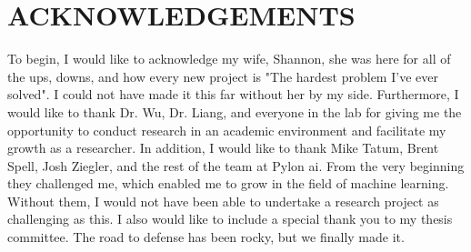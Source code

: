 \singlespacing
\chapter*{ACKNOWLEDGEMENTS}
\doublespacing
To begin, I would like to acknowledge my wife, Shannon, she was here for all of the ups, downs, and how every new project is "The hardest problem I've ever solved". I could not have made it this far without her by my side. Furthermore, I would like to thank Dr. Wu, Dr. Liang, and everyone in the lab for giving me the opportunity to conduct research in an academic environment and facilitate my growth as a researcher. In addition, I would like to thank Mike Tatum, Brent Spell, Josh Ziegler, and the rest of the team at Pylon ai. From the very beginning they challenged me, which enabled me to grow in the field of machine learning. Without them, I would not have been able to undertake a research project as challenging as this. I also would like to include a special thank you to my thesis committee. The road to defense has been rocky, but we finally made it.
